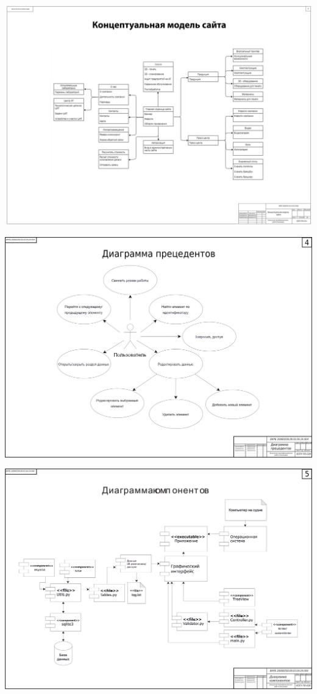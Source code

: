 \begin{landscape}
\begin{плакат}
	\includegraphics[width=0.82\linewidth]{images/плакат3}
	\label{fig:3}
\end{плакат}

\begin{плакат}
	\includegraphics[width=0.82\linewidth]{images/плакат4.png}
	\label{fig:4}
\end{плакат}

\begin{плакат}
	\includegraphics[width=0.82\linewidth]{images/плакат5.png}
	\label{fig:5}
\end{плакат}


\end{landscape}

